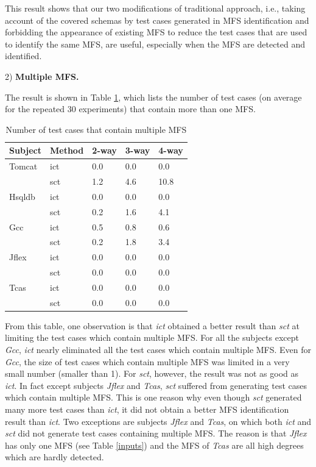 \documentclass[10pt,journal,compsoc]{IEEEtran}
\begin{document}
This result shows that our two modifications of traditional approach, i.e., taking account of the covered schemas by test cases generated in MFS identification and forbidding the appearance of existing MFS to reduce the test cases that are used to identify the same MFS, are useful, especially when the MFS are detected and identified.

2) \textbf{Multiple MFS.}

The result is shown in Table \ref{multi_mfs}, which lists the number of test cases (on average for the repeated 30 experiments) that contain more than one MFS.

\begin{table}[ht]
\centering
\caption{Number of test cases that contain multiple MFS}
\label{multi_mfs}
\begin{tabular}{|ll|lll|}
\hline
Subject & Method & 2-way       & 3-way       & 4-way       \\ \hline
Tomcat	&ict	&0.0	&0.0	&0.0	\\
	&sct	&1.2	&4.6	&10.8	\\\hline
Hsqldb	&ict	&0.0	&0.0	&0.0	\\
	&sct	&0.2	&1.6	&4.1	\\\hline
Gcc	&ict	&0.5	&0.8	&0.6	\\
	&sct	&0.2	&1.8	&3.4	\\\hline
Jflex	&ict	&0.0	&0.0	&0.0	\\
	&sct	&0.0	&0.0	&0.0	\\\hline
Tcas	&ict	&0.0	&0.0	&0.0	\\
	&sct	&0.0	&0.0	&0.0	\\\hline
\end{tabular}
\end{table}



From this table, one observation is that \emph{ict} obtained a better result than \emph{sct} at limiting the test cases which contain multiple MFS. For all the subjects except \emph{Gcc}, \emph{ict} nearly eliminated all the test cases which contain multiple MFS. Even for \emph{Gcc}, the size of test cases which contain multiple MFS was limited in a very small number (smaller than 1). For \emph{sct}, however, the result was not as good as \emph{ict}. In fact except subjects \emph{Jflex} and \emph{Tcas}, \emph{sct} suffered from generating test cases which contain multiple MFS. This is one reason why even though \emph{sct} generated many more test cases than \emph{ict}, it did not obtain a better MFS identification result than \emph{ict}. Two exceptions are subjects \emph{Jflex} and \emph{Tcas}, on which both \emph{ict} and \emph{sct} did not generate test cases containing multiple MFS. The reason is that \emph{Jflex} has only one MFS (see Table \ref{inputs}) and the MFS of \emph{Tcas} are all high degrees which are hardly detected.
\end{document}
